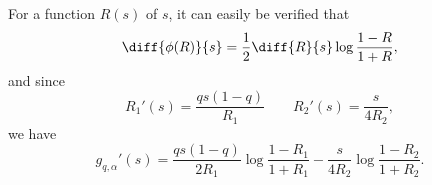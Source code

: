 \documentclass[10pt, a4paper]{article}
\newcommand{\?}{\mathrel{?}} %
\numberwithin{equation}{section} %
\theoremstyle{definition}
\theoremstyle{plain}
\theoremstyle{plain}
\begin{document}
    For a function \(R(s)\) of \(s\), it can easily be verified that
    \begin{equation}
      \diff{\phi(R)}{s} = \frac{1}{2} \diff{R}{s} \log\frac{1-R}{1+R},
    \end{equation}
    and since
    \begin{equation} 
      R_1'(s) = \frac{qs(1-q)}{R_1} \qquad R_2'(s) = \frac{s}{4R_2},
    \end{equation}
    we have
    \begin{equation}
      g_{q,\alpha}'(s) = \frac{qs(1-q)}{2R_1} \log\frac{1-R_1}{1+R_1} - \frac{s}{4R_2} \log\frac{1-R_2}{1+R_2}.
    \end{equation}


  
\end{document}
